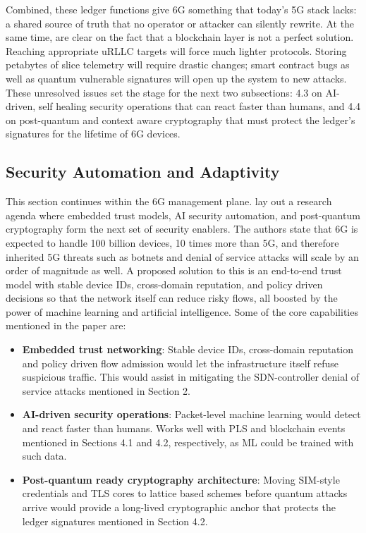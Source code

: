\documentclass[acmtog]{acmart}
\begin{document}
Combined, these ledger functions give 6G something that today's 5G stack lacks: a shared source of truth that no operator or attacker can silently rewrite. At the same time, \cite{ref2} are clear on the fact that a blockchain layer is not a perfect solution. Reaching appropriate uRLLC targets will force much lighter protocols. Storing petabytes of slice telemetry will require drastic changes; smart contract bugs as well as quantum vulnerable signatures will open up the system to new attacks. These unresolved issues set the stage for the next two subsections: 4.3 on AI-driven, self healing security operations that can react faster than humans, and 4.4 on post-quantum and context aware cryptography that must protect the ledger's signatures for the lifetime of 6G devices.

\subsection{Security Automation and Adaptivity}
This section continues within the 6G management plane.  \cite{ref5} lay out a research agenda where embedded trust models, AI security automation, and post-quantum cryptography form the next set of security enablers. The authors state that 6G is expected to handle 100 billion devices, 10 times more than 5G, and therefore inherited 5G threats such as botnets and denial of service attacks will scale by an order of magnitude as well. A proposed solution to this is an end-to-end trust model with stable device IDs, cross-domain reputation, and policy driven decisions so that the network itself can reduce risky flows, all boosted by the power of machine learning and artificial intelligence. Some of the core capabilities mentioned in the paper are:
\begin{itemize}
  \item \textbf{Embedded trust networking}: Stable device IDs, cross-domain reputation and policy driven flow admission would let the infrastructure itself refuse suspicious traffic. This would assist in mitigating the SDN-controller denial of service attacks mentioned in Section 2.
  \item \textbf{AI-driven security operations}: Packet-level machine learning would detect and react faster than humans. Works well with PLS and blockchain events mentioned in Sections 4.1 and 4.2, respectively, as ML could be trained with such data.
  \item \textbf{Post-quantum ready cryptography architecture}:  Moving SIM-style credentials and TLS cores to lattice based schemes before quantum attacks arrive would provide a long-lived cryptographic anchor that protects the ledger signatures mentioned in Section 4.2.
\end{itemize}
\end{document}
